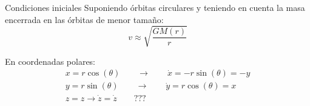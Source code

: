 \documentclass{beamer}
\begin{document}
\begin{frame}{Condiciones iniciales}
	Suponiendo \'orbitas circulares y teniendo en cuenta la masa encerrada en las \'orbitas de menor tama\~no:
	\begin{equation}
		v \approx \sqrt{\dfrac{GM(r)}{r}}
	\end{equation}\pause
	
	En coordenadas polares:
	\begin{equation}
		\begin{matrix}
			x = r\cos(\theta) \qquad \longrightarrow \qquad \dot{x} = -r\sin(\theta) = -y \\
			y = r\sin(\theta) \qquad \longrightarrow \qquad \dot{y} = r\cos(\theta) = x\\
			z = z \longrightarrow \dot{z} = \dot{z} \qquad??? \\
		\end{matrix}
	\end{equation}
\end{frame}
\end{document}
